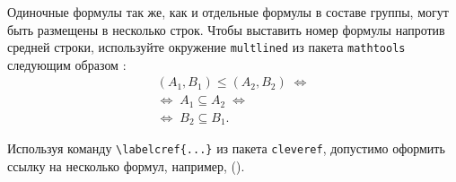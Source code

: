Одиночные формулы так же, как и отдельные формулы в составе группы, могут быть размещены в несколько строк. Чтобы выставить номер формулы напротив средней строки, используйте окружение \verb|multlined| из пакета \verb|mathtools| следующим образом \cite{Ganter1999}:
\begin{equation} %
\label{eq:fConcept-order-G}
\begin{multlined}
(A_1,B_1)\leq (A_2,B_2)\; \Leftrightarrow \\  \Leftrightarrow\; A_1\subseteq A_2\; \Leftrightarrow \\ \Leftrightarrow\; B_2\subseteq B_1. 
\end{multlined}
\end{equation}

	
Используя команду \verb|\labelcref{...}| из пакета \verb|cleveref|, допустимо оформить ссылку на несколько формул, например, ().